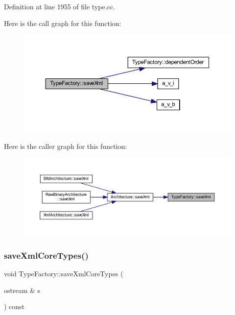 Definition at line 1955 of file type.\+cc.

Here is the call graph for this function\+:
\nopagebreak
\begin{figure}[H]
\begin{center}
\leavevmode
\includegraphics[width=350pt]{class_type_factory_adf9b9838cfe8166a236de6562f6dfcc3_cgraph}
\end{center}
\end{figure}
Here is the caller graph for this function\+:
\nopagebreak
\begin{figure}[H]
\begin{center}
\leavevmode
\includegraphics[width=350pt]{class_type_factory_adf9b9838cfe8166a236de6562f6dfcc3_icgraph}
\end{center}
\end{figure}
\mbox{\label{class_type_factory_a1caebbe3620eee3ba78427608b1126dd}} 
\subsubsection{\texorpdfstring{saveXmlCoreTypes()}{saveXmlCoreTypes()}}
{\footnotesize\ttfamily void Type\+Factory\+::save\+Xml\+Core\+Types (\begin{DoxyParamCaption}\item[{ostream \&}]{s }\end{DoxyParamCaption}) const}




